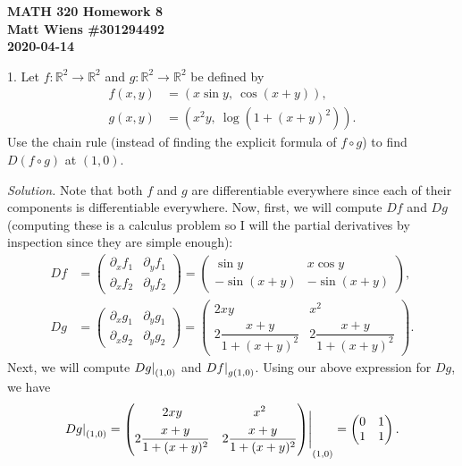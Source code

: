 \documentclass{article}
\newcommand{\0}{\mathbf{0}}
\newcommand{\R}{\mathbb{R}}
\begin{document}
\textbf{MATH 320 Homework 8} \\
\textbf{Matt Wiens \#301294492} \\
\textbf{2020-04-14}

1. Let $f: \R^2 \to \R^2$ and $g: \R^2 \to \R^2$ be defined by
%
\begin{align*}
    f(x, y) &= (x \sin y, \ \cos(x+y)), \\
    g(x, y) &= (x^2 y, \ \log (1+(x+y)^2))
    .
\end{align*}
%
Use the chain rule (instead of finding the explicit formula of $f \circ
g$) to find $D(f \circ g)$ at $(1, 0)$.

\textit{Solution.}
Note that both $f$ and $g$ are differentiable everywhere since each of
their components is differentiable everywhere. Now, first, we will
compute $D f$ and $D g$ (computing these is a calculus problem so I will
the partial derivatives by inspection since they are simple enough):
%
\begin{align*}
    D f
    &=
        \begin{pmatrix}
            \partial_x f_1 & \partial_y f_1 \\
            \partial_x f_2 & \partial_y f_2
        \end{pmatrix}
    =
        \begin{pmatrix}
            \sin y & x \cos y \\
            - \sin(x + y) & - \sin(x + y)
        \end{pmatrix}
        ,
    \\
    D g
    &=
        \begin{pmatrix}
            \partial_x g_1 & \partial_y g_1 \\
            \partial_x g_2 & \partial_y g_2
        \end{pmatrix}
    =
        \begin{pmatrix}
            2 x y & x^2 \\[5pt]
            2 \dfrac{x + y}{1 + (x + y)^2} & 2 \dfrac{x + y}{1 + (x + y)^2}
        \end{pmatrix}
        .
\end{align*}
%
Next, we will compute $\eval[0]{D g}_{(1, 0)}$ and $\eval[0]{D f}_{g(1,
0)}$. Using our above expression for $D g$, we have
%
\begin{equation*}
    \eval[0]{D g}_{(1, 0)}
    =
    \eval{
        \begin{pmatrix}
            2 x y & x^2 \\[5pt]
            2 \dfrac{x + y}{1 + (x + y)^2} & 2 \dfrac{x + y}{1 + (x + y)^2}
        \end{pmatrix}
    }_{(1, 0)}
    =
        \begin{pmatrix}
            0 & 1 \\
            1 & 1
        \end{pmatrix}
    .
\end{equation*}
\end{document}
